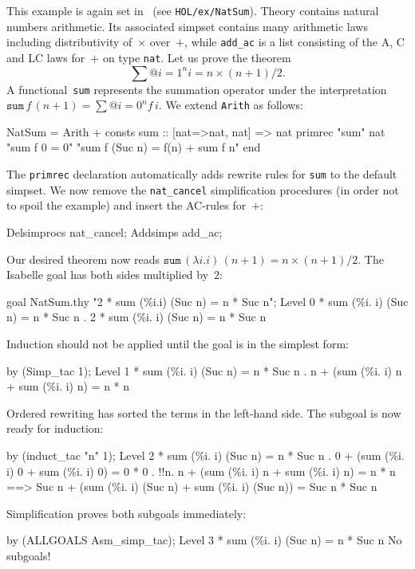 This example is again set in \HOL\ (see \texttt{HOL/ex/NatSum}).
Theory  contains natural numbers arithmetic.  Its
associated simpset contains many arithmetic laws including
distributivity of~$\times$ over~$+$, while \texttt{add_ac} is a list
consisting of the A, C and LC laws for~$+$ on type \texttt{nat}.  Let
us prove the theorem
\[ \sum@{i=1}^n i = n\times(n+1)/2. \]
%
A functional~\texttt{sum} represents the summation operator under the
interpretation $\texttt{sum} \, f \, (n + 1) = \sum@{i=0}^n f\,i$.  We
extend \texttt{Arith} as follows:
\begin{ttbox}
NatSum = Arith +
consts sum     :: [nat=>nat, nat] => nat
primrec "sum" nat 
  "sum f 0 = 0"
  "sum f (Suc n) = f(n) + sum f n"
end
\end{ttbox}
The \texttt{primrec} declaration automatically adds rewrite rules for
\texttt{sum} to the default simpset.  We now remove the
\texttt{nat_cancel} simplification procedures (in order not to spoil
the example) and insert the AC-rules for~$+$:
\begin{ttbox}
Delsimprocs nat_cancel;
Addsimps add_ac;
\end{ttbox}
Our desired theorem now reads $\texttt{sum} \, (\lambda i.i) \, (n+1) =
n\times(n+1)/2$.  The Isabelle goal has both sides multiplied by~$2$:
\begin{ttbox}
goal NatSum.thy "2 * sum (\%i.i) (Suc n) = n * Suc n";
{\out Level 0}
{ * sum (\%i. i) (Suc n) = n * Suc n}
{. 2 * sum (\%i. i) (Suc n) = n * Suc n}
\end{ttbox}
Induction should not be applied until the goal is in the simplest
form:
\begin{ttbox}
by (Simp_tac 1);
{\out Level 1}
{ * sum (\%i. i) (Suc n) = n * Suc n}
{. n + (sum (\%i. i) n + sum (\%i. i) n) = n * n}
\end{ttbox}
Ordered rewriting has sorted the terms in the left-hand side.  The
subgoal is now ready for induction:
\begin{ttbox}
by (induct_tac "n" 1);
{\out Level 2}
{ * sum (\%i. i) (Suc n) = n * Suc n}
{. 0 + (sum (\%i. i) 0 + sum (\%i. i) 0) = 0 * 0}
\ttbreak
{. !!n. n + (sum (\%i. i) n + sum (\%i. i) n) = n * n}
{\out           ==> Suc n + (sum (\%i. i) (Suc n) + sum (\%i. i) (Suc n)) =}
{\out               Suc n * Suc n}
\end{ttbox}
Simplification proves both subgoals immediately:
\begin{ttbox}
by (ALLGOALS Asm_simp_tac);
{\out Level 3}
{ * sum (\%i. i) (Suc n) = n * Suc n}
{\out No subgoals!}
\end{ttbox}
